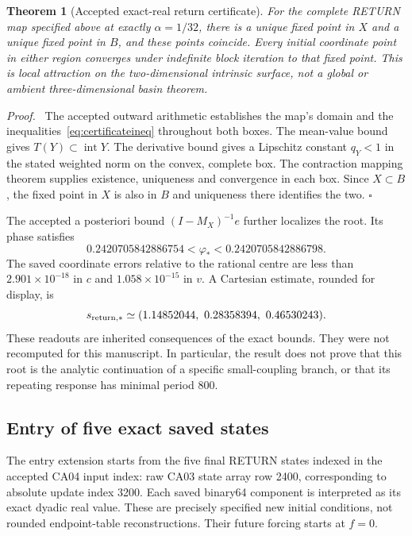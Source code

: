 \documentclass[11pt,a4paper]{article}
\newenvironment{proof}{\par\noindent\textit{Proof.}\ }{\hfill$\square$\par}
\newtheorem{theorem}{Theorem}[section]
\numberwithin{equation}{section}
\begin{document}
\begin{theorem}[Accepted exact-real return certificate]\label{thm:certificate}
For the complete RETURN map specified above at exactly $\alpha=1/32$, there is a unique fixed point in $X$ and a unique fixed point in $B$, and these points coincide. Every initial coordinate point in either region converges under indefinite block iteration to that fixed point. This is local attraction on the two-dimensional intrinsic surface, not a global or ambient three-dimensional basin theorem.
\end{theorem}
\begin{proof}
The accepted outward arithmetic establishes the map's domain and the inequalities~\eqref{eq:certificateineq} throughout both boxes. The mean-value bound gives $T(Y)\subset\operatorname{int}Y$. The derivative bound gives a Lipschitz constant $q_Y<1$ in the stated weighted norm on the convex, complete box. The contraction mapping theorem supplies existence, uniqueness and convergence in each box. Since $X\subset B$, the fixed point in $X$ is also in $B$ and uniqueness there identifies the two.
\end{proof}

The accepted a posteriori bound $(I-M_X)^{-1}e$ further localizes the root. Its phase satisfies
\begin{equation}\label{eq:rootphase}
0.2420705842886754<\varphi_*<0.2420705842886798.
\end{equation}
The saved coordinate errors relative to the rational centre are less than $2.901\times10^{-18}$ in $c$ and $1.058\times10^{-15}$ in $v$. A Cartesian estimate, rounded for display, is
\begin{equation}\label{eq:rootcart}
s_{\rm return,*}\simeq(1.14852044,\ 0.28358394,\ 0.46530243).
\end{equation}
These readouts are inherited consequences of the exact bounds. They were not recomputed for this manuscript. In particular, the result does not prove that this root is the analytic continuation of a specific small-coupling branch, or that its repeating response has minimal period 800.

\subsection{Entry of five exact saved states}
The entry extension starts from the five final RETURN states indexed in the accepted CA04 input index: raw CA03 state array row 2400, corresponding to absolute update index 3200. Each saved binary64 component is interpreted as its exact dyadic real value. These are precisely specified new initial conditions, not rounded endpoint-table reconstructions. Their future forcing starts at $f=0$.
\end{document}
